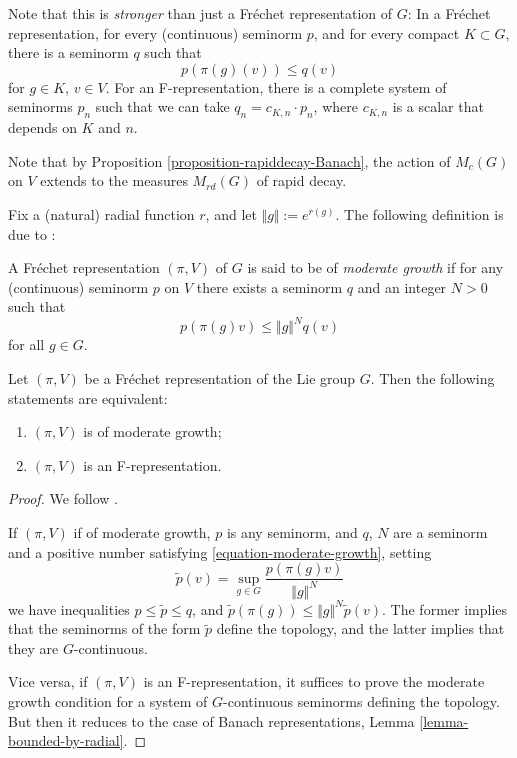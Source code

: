 Note that this is {\it stronger} than just a Fr\'echet representation of $G$: In a Fr\'echet representation, for every (continuous) seminorm $p$, and for every compact $K\subset G$, there is a seminorm $q$ such that 
$$ p(\pi(g) (v)) \le q(v)$$
for $g\in K$, $v\in V$. For an F-representation, there is a complete system of seminorms $p_n$ such that we can take $q_n=c_{K,n}\cdot p_n$, where $c_{K,n}$ is a scalar that depends on $K$ and $n$.

Note that by Proposition \ref{proposition-rapiddecay-Banach}, the action of $M_c(G)$ on $V$ extends to the measures $M_{rd}(G)$ of rapid decay. 

Fix a (natural) radial function $r$, and let $\Vert g\Vert:= e^{r(g)}$. The following definition is due to \cite{Casselman-canonicalextensions}:

\begin{definition}
\label{definition-moderate-growth}
A Fr\'echet representation $(\pi,V)$ of $G$ is said to be of {\it moderate
growth} if for any (continuous) seminorm $p$ on $V$ there exists a seminorm $q$
and an integer $N > 0$ such that
\begin{equation}
\label{equation-moderate-growth}
p(\pi(g)v) \le \Vert g\Vert^N q(v)
\end{equation}
for all $g \in G$.
\end{definition}

\begin{lemma}
\label{lemma-F-moderate-growth} 
 Let $(\pi, V)$ be a Fr\'echet representation of the Lie group
$G$. Then the following statements are equivalent:
\begin{enumerate}
 \item  $(\pi,V)$ is of moderate growth;
 \item $(\pi, V)$ is an F-representation.
\end{enumerate}
\end{lemma}

\begin{proof}
We follow \cite[Lemma 2.10]{Bernstein-Kroetz}.

If $(\pi, V)$ if of moderate growth, $p$ is any seminorm, and $q$, $N$ are a seminorm and a positive number satisfying \eqref{equation-moderate-growth}, setting 
$$ \tilde p (v) = \sup_{g\in G} \frac{p(\pi(g)v)}{\Vert g\Vert^N}$$ 
we have inequalities $p\le \tilde p\le q$, and $\tilde p(\pi(g)) \le \Vert g\Vert^N \tilde p(v)$. The former implies that the seminorms of the form $\tilde p$ define the topology, and the latter implies that they are $G$-continuous.

Vice versa, if $(\pi, V)$ is an F-representation, it suffices to prove the moderate growth condition for a system of $G$-continuous seminorms defining the topology. But then it reduces to the case of Banach representations, Lemma \ref{lemma-bounded-by-radial}. 
\end{proof}

